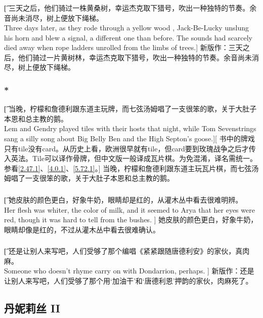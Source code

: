 \documentclass[12pt,a4paper]{article}
\begin{document}
\subsubsection{}\t[
	三天之后，他们骑过一株黄桑树，幸运杰克取下猎号，吹出一种独特的节奏。余音尚未消尽，树上便放下绳梯。\\
	Three days later, as they rode through a yellow wood , Jack-Be-Lucky unslung his horn and blew a signal, a different one than before. The sounds had scarcely died away when rope ladders unrolled from the limbs of trees.]
	新版作：三天之后，他们骑过一片黄树林，幸运杰克取下猎号，吹出一种独特的节奏。余音尚未消尽，树上便放下绳梯。
	
\subsubsection{\color{red}*}\label{3.22.1}\t[
	当晚，柠檬和詹德利跟东道主玩牌，而七弦汤姆唱了一支很笨的歌，关于大肚子本恩和总主教的鹅。\\
	Lem and Gendry played tiles with their hosts that night, while Tom Sevenstrings sang a silly song about Big Belly Ben and the High Septon's goose.][
	书中的牌戏只有tile没有card。从历史上看，欧洲很早就有tile，但card要到玫瑰战争之后才传入英法。Tile可以译作骨牌，但中文版一般译成瓦片棋。为免混淆，译名需统一。参看\ref{2.47.1}、\ref{4.0.1}、\ref{5.72.1}。]
	当晚，柠檬和詹德利跟东道主玩瓦片棋，而七弦汤姆唱了一支很笨的歌，关于大肚子本恩和总主教的鹅。
	
\subsubsection{}\t[
	她皮肤的颜色更白，好象牛奶，眼睛却是红的，从灌木丛中看去很难明辨。\\
	Her flesh was whiter, the color of milk, and it seemed to Arya that her eyes were red, though it was hard to tell from the bushes. ]
	她皮肤的颜色更白，好象牛奶，眼睛却像是红的，不过从灌木丛中看去很难确认。
	
\subsubsection{}\t[
	还是让别人来写吧，人们受够了那个编唱《紧紧跟随唐德利安》的家伙，真肉麻。\\
	Someone who doesn't rhyme carry on with Dondarrion, perhaps. ]
	新版作：还是让别人来写吧，人们受够了那个用‘加油干’和‘唐德利恩’押韵的家伙，肉麻死了。
		
\subsection{丹妮莉丝 II}
\end{document}
